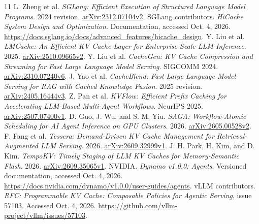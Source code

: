 \documentclass[10pt,a4paper]{article}
\begin{document}
\vspace{-3pt}
\begin{thebibliography}{11}\small\setlength{\itemsep}{1pt}
 L. Zheng et al. \emph{SGLang: Efficient Execution of Structured Language Model Programs}. 2024 revision. \href{https://arxiv.org/abs/2312.07104v2}{arXiv:2312.07104v2}.
 SGLang contributors. \emph{HiCache System Design and Optimization}. Documentation, accessed Oct. 4, 2026. \url{https://docs.sglang.io/docs/advanced_features/hicache_design}.
 Y. Liu et al. \emph{LMCache: An Efficient KV Cache Layer for Enterprise-Scale LLM Inference}. 2025. \href{https://arxiv.org/abs/2510.09665v2}{arXiv:2510.09665v2}.
 Y. Liu et al. \emph{CacheGen: KV Cache Compression and Streaming for Fast Large Language Model Serving}. SIGCOMM 2024. \href{https://arxiv.org/abs/2310.07240v6}{arXiv:2310.07240v6}.
 J. Yao et al. \emph{CacheBlend: Fast Large Language Model Serving for RAG with Cached Knowledge Fusion}. 2025 revision. \href{https://arxiv.org/abs/2405.16444v3}{arXiv:2405.16444v3}.
 Z. Pan et al. \emph{KVFlow: Efficient Prefix Caching for Accelerating LLM-Based Multi-Agent Workflows}. NeurIPS 2025. \href{https://arxiv.org/abs/2507.07400v1}{arXiv:2507.07400v1}.
 D. Guo, J. Wu, and S. M. Yiu. \emph{SAGA: Workflow-Atomic Scheduling for AI Agent Inference on GPU Clusters}. 2026. \href{https://arxiv.org/abs/2605.00528v2}{arXiv:2605.00528v2}.
 F. Fang et al. \emph{Tessera: Demand-Driven KV Cache Management for Retrieval-Augmented LLM Serving}. 2026. \href{https://arxiv.org/abs/2609.32999v1}{arXiv:2609.32999v1}.
 J. H. Park, H. Kim, and D. Kim. \emph{TempoKV: Timely Staging of LLM KV Caches for Memory-Semantic Flash}. 2026. \href{https://arxiv.org/abs/2609.35065v1}{arXiv:2609.35065v1}.
 NVIDIA. \emph{Dynamo v1.0.0: Agents}. Versioned documentation, accessed Oct. 4, 2026. \url{https://docs.nvidia.com/dynamo/v1.0.0/user-guides/agents}.
 vLLM contributors. \emph{RFC: Programmable KV Cache: Composable Policies for Agentic Serving}, issue 57103. Accessed Oct. 4, 2026. \url{https://github.com/vllm-project/vllm/issues/57103}.
\end{thebibliography}
\end{document}

